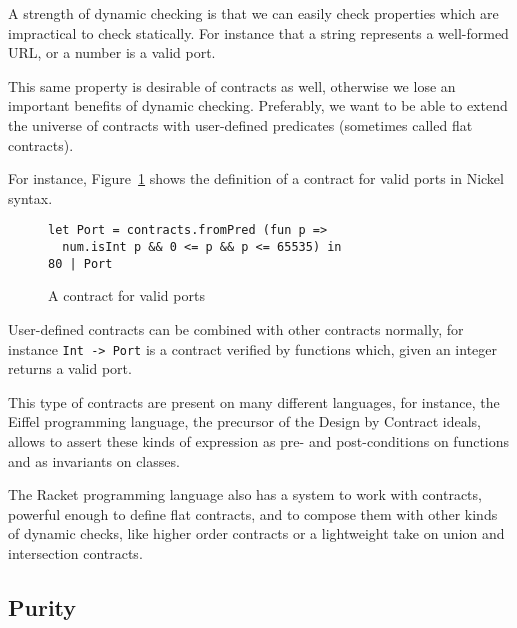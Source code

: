 \documentclass[sigplan,10pt,review,anonymous]{acmart}
\newcommand{\unsure}[2][1=]{}
\newcommand{\info}[2][1=]{}
\newcommand{\nickel}[1]{\lstinline[language=nickel]{#1}}
\begin{document}
A strength of dynamic checking is that we can easily check properties which
are impractical to check statically. For instance that a string
represents a well-formed URL, or a number is a valid port.

This same property is desirable of contracts as well, otherwise we
lose an important benefits of dynamic checking. Preferably, we want to
be able to extend the universe of contracts with user-defined
predicates (sometimes called flat contracts).

For instance, Figure~\ref{fig:port-contract} shows the definition of a
contract for valid ports in Nickel syntax.

\begin{figure}[h]
  \begin{center}
\begin{lstlisting}[language=nickel]
let Port = contracts.fromPred (fun p =>
  num.isInt p && 0 <= p && p <= 65535) in
80 | Port
\end{lstlisting}
\end{center}
\caption{A contract for valid ports}
\label{fig:port-contract}
\end{figure}

User-defined contracts can be combined with other contracts normally,
for instance \nickel{Int -> Port} is a contract verified by functions
which, given an integer returns a valid port.

This type of contracts are present on many different languages,
for instance, the Eiffel programming language\cite{meyer1987eiffel}, the precursor
of the Design by Contract ideals, allows to assert
these kinds of expression as pre- and post-conditions on
functions and as invariants on classes\cite{EiffelDesignByContract}.

The Racket programming language also has a system to work with
contracts, powerful enough to define flat contracts, and
to compose them with other kinds of dynamic checks,
like higher order contracts or a lightweight take on union
and intersection contracts\cite{RacketContracts}.


\subsection{Purity}
\label{sec:optimizations}
\info{Present inlining and CSE as two major code
optimizations.
Purity and immutability as two important factors.}

\unsure{I (Arnaud) changed the title of this subsection. Maybe it's
  not the best one, but if it is, then we ought to reorder the section
  a little bit to fit the modified narrative.}
\end{document}
